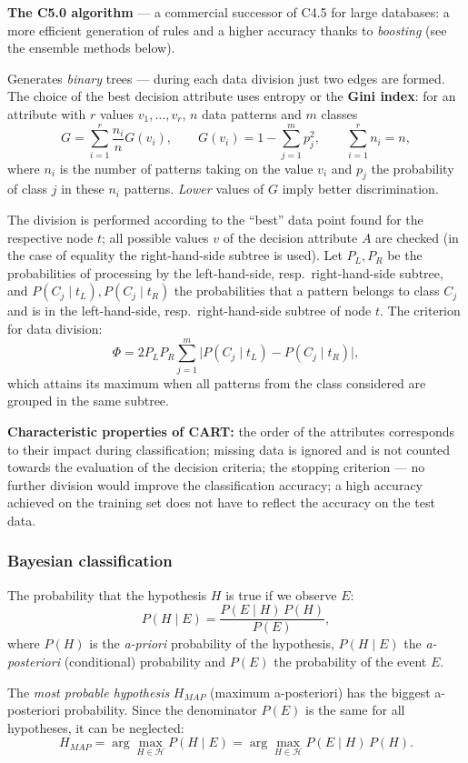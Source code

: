 \documentclass[11pt,a4paper]{article}
\theoremstyle{definition}
\providecommand{\uv}[1]{``#1''}
\begin{document}
\textbf{The C5.0 algorithm} --- a commercial successor of C4.5 for large databases: a more
efficient generation of rules and a higher accuracy thanks to \emph{boosting} (see the
ensemble methods below).

\begin{defbox}
Generates \emph{binary} trees --- during each data division just two edges are formed. The choice
of the best decision attribute uses entropy or the \textbf{Gini index}: for an attribute with $r$
values $v_1,\dots,v_r$, $n$ data patterns and $m$ classes
\[ G=\sum_{i=1}^{r}\frac{n_i}{n}G(v_i),\qquad G(v_i)=1-\sum_{j=1}^{m}p_j^2,
   \qquad \sum_{i=1}^{r}n_i=n, \]
where $n_i$ is the number of patterns taking on the value $v_i$ and $p_j$ the probability of class
$j$ in these $n_i$ patterns. \emph{Lower} values of $G$ imply better discrimination.

The division is performed according to the \uv{best} data point found for the respective node
$t$; all possible values $v$ of the decision attribute $A$ are checked (in the case of equality
the right-hand-side subtree is used). Let $P_L,P_R$ be the probabilities of processing by the
left-hand-side, resp.\ right-hand-side subtree, and $P(C_j\mid t_L),P(C_j\mid t_R)$ the
probabilities that a pattern belongs to class $C_j$ and is in the left-hand-side, resp.\
right-hand-side subtree of node $t$. The criterion for data division:
\[ \Phi=2P_LP_R\sum_{j=1}^{m}\big|P(C_j\mid t_L)-P(C_j\mid t_R)\big|, \]
which attains its maximum when all patterns from the class considered are grouped in the same
subtree.

\textbf{Characteristic properties of CART:} the order of the attributes corresponds to their
impact during classification; missing data is ignored and is not counted towards the evaluation of
the decision criteria; the stopping criterion --- no further division would improve the
classification accuracy; a high accuracy achieved on the training set does not have to reflect the
accuracy on the test data.
\end{defbox}

\subsubsection{Bayesian classification}

\begin{defbox}
The probability that the hypothesis $H$ is true if we observe $E$:
\[ P(H\mid E)=\frac{P(E\mid H)\,P(H)}{P(E)}, \]
where $P(H)$ is the \emph{a-priori} probability of the hypothesis, $P(H\mid E)$ the
\emph{a-posteriori} (conditional) probability and $P(E)$ the probability of the event $E$.

The \emph{most probable hypothesis} $H_{MAP}$ (maximum a-posteriori) has the biggest a-posteriori
probability. Since the denominator $P(E)$ is the same for all hypotheses, it can be neglected:
\[ H_{MAP}=\arg\max_{H\in\mathcal H} P(H\mid E)=\arg\max_{H\in\mathcal H} P(E\mid H)\,P(H). \]
\end{defbox}
\end{document}
